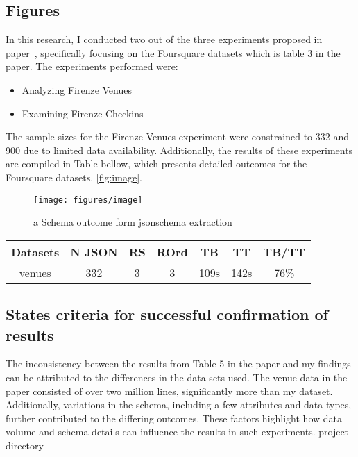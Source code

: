 \documentclass[sigconf, nonacm]{acmart}
\begin{document}
\subsection{Figures}

In this research, I conducted two out of the three experiments proposed in paper~\cite{8424731}, specifically focusing on the Foursquare datasets which is table 3 in the paper. The experiments performed were:

\begin{itemize}
    \item Analyzing Firenze Venues
    \item Examining Firenze Checkins
\end{itemize}
The sample sizes for the Firenze Venues experiment were constrained to 332 and 900 due to limited data availability. Additionally, the results of these experiments are compiled in Table bellow, which presents detailed outcomes for the Foursquare datasets. \autoref{fig:image}.

\begin{figure}
  \centering
  \texttt{[image: figures/image]}
  \caption{a Schema outcome form jsonschema extraction }
  \label{fig:image}
\end{figure}



\begin{tabular}{|c|c|c|c|c|c|c|}
  \hline
  Datasets & N JSON & RS & ROrd & TB & TT & TB/TT \\
  \hline
  venues & 332 &  3 & 3 & 109s & 142s & 76\%\\
  \hline
\end{tabular}




\subsection{States criteria for successful confirmation of results}

The inconsistency between the results from Table 5 in the paper and my findings can be attributed to the differences in the data sets used. The venue data in the paper consisted of over two million lines, significantly more than my dataset. Additionally, variations in the schema, including a few attributes and data types, further contributed to the differing outcomes. These factors highlight how data volume and schema details can influence the results in such experiments. project directory~\cite{project1}






\end{document}
